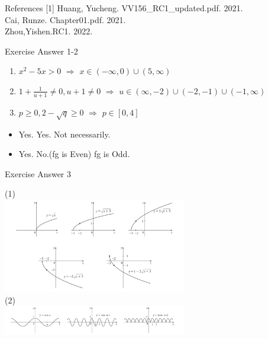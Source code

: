 \begin{frame}{References}
    [1] Huang, Yucheng. VV156\_RC1\_updated.pdf. 2021.\\
    \bigskip
    [2] Cai, Runze. Chapter01.pdf. 2021.\\
    \bigskip
    [3] Zhou,Yishen.RC1. 2022.
\end{frame}

\begin{frame}{Exercise Answer 1-2}
    \begin{enumerate}
        \item $x^2-5x>0$ $\Rightarrow$ $x\in (-\infty,0)\cup (5,\infty)$
        \item $1+\frac{1}{u+1}\neq0,u+1\neq0$ $\Rightarrow$ $u\in (\infty,-2)\cup(-2,-1)\cup (-1,\infty)$
        \item $p\geq0,2-\sqrt{q}\geq0$ $\Rightarrow$ $p\in [0,4]$
    \end{enumerate}
    \vspace{1.5cm}
    \begin{itemize}
        \item Yes. Yes. Not necessarily.
        \item Yes. No.(fg is Even) fg is Odd.
    \end{itemize}
\end{frame}


\begin{frame}{Exercise Answer 3}
    \begin{center}
        (1)\\
        \includegraphics[width =8cm]{res/514.png}\\
        \vspace{1cm}
        (2)\\
        \includegraphics[width =8cm]{res/114.png}
    \end{center}
\end{frame}

